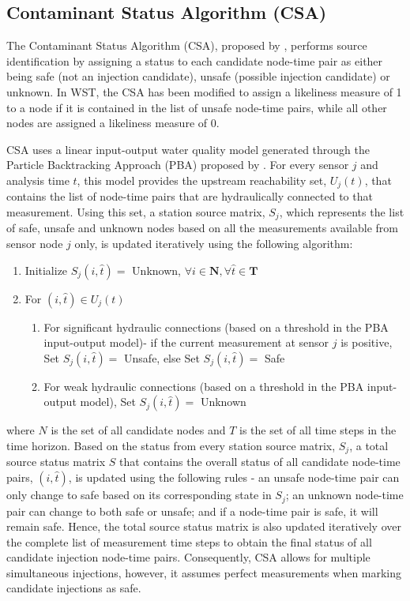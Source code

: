 \subsection{Contaminant Status Algorithm (CSA)}
\label{sec.csa_algorithm}

The Contaminant Status Algorithm (CSA), proposed by \citet{csa},
performs source identification by assigning a status to each candidate
node-time pair as either being safe (not an injection candidate),
unsafe (possible injection candidate) or unknown. In WST, the CSA has
been modified to assign a likeliness measure of 1 to a node if it is
contained in the list of unsafe node-time pairs, while all other nodes
are assigned a likeliness measure of 0.

CSA uses a linear input-output water quality model generated through
the Particle Backtracking Approach (PBA) proposed
by \citet{Shang2002}. For every sensor $j$ and analysis time $t$, this
model provides the upstream reachability set, $U_j(t)$, that contains
the list of node-time pairs that are hydraulically connected to that
measurement. Using this set, a station source matrix, $S_j$, which
represents the list of safe, unsafe and unknown nodes based on all the
measurements available from sensor node $j$ only, is updated
iteratively using the following algorithm:

\begin{enumerate}
\item Initialize $S_j(i,\hat{t}) = $ Unknown, $\forall i \in \mathbf{N}, \forall \hat{t} \in \mathbf{T} $
\item For $(i,\hat{t}) \in U_j(t)$
        \begin{enumerate}
                \item For significant hydraulic connections (based on a threshold in the PBA input-output model)-
                        if the current measurement at sensor $j$ is positive, Set $S_j(i,\hat{t}) = $ Unsafe,
                        else Set $S_j(i,\hat{t}) = $ Safe
                \item For weak hydraulic connections (based on a threshold in the PBA input-output model), Set $S_j(i,\hat{t}) = $ Unknown
        \end{enumerate}
\end{enumerate}
where $N$ is the set of all candidate nodes and $T$ is the set of all
time steps in the time horizon. Based on the status from every
station source matrix, $S_j$, a total source status matrix $S$ that
contains the overall status of all candidate node-time pairs,
$(i,\hat{t})$, is updated using the following rules - an unsafe
node-time pair can only change to safe based on its corresponding
state in $S_j$; an unknown node-time pair can change to both safe or
unsafe; and if a node-time pair is safe, it will remain safe. Hence,
the total source status matrix is also updated iteratively over the
complete list of measurement time steps to obtain the final status of
all candidate injection node-time pairs. Consequently, CSA allows for
multiple simultaneous injections, however, it assumes perfect
measurements when marking candidate injections as safe.


